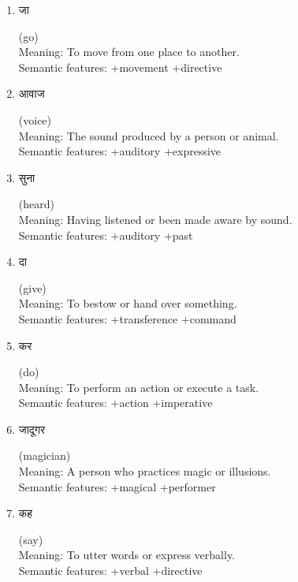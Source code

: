 \documentclass{article}
\begin{document}
\begin{enumerate}
\item \begin{hindi} जा \end{hindi} (go) \\
Meaning: To move from one place to another. \\
Semantic features: +movement +directive

\item \begin{hindi} आवाज \end{hindi} (voice) \\
Meaning: The sound produced by a person or animal. \\
Semantic features: +auditory +expressive

\item \begin{hindi} सुना \end{hindi} (heard) \\
Meaning: Having listened or been made aware by sound. \\
Semantic features: +auditory +past

\item \begin{hindi} दा \end{hindi} (give) \\
Meaning: To bestow or hand over something. \\
Semantic features: +transference +command

\item \begin{hindi} कर \end{hindi} (do) \\
Meaning: To perform an action or execute a task. \\
Semantic features: +action +imperative

\item \begin{hindi} जादूगर \end{hindi} (magician) \\
Meaning: A person who practices magic or illusions. \\
Semantic features: +magical +performer

\item \begin{hindi} कह \end{hindi} (say) \\
Meaning: To utter words or express verbally. \\
Semantic features: +verbal +directive


\end{enumerate}
\end{document}
